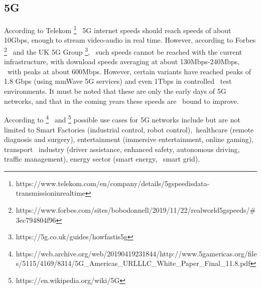 \subsection{5G}
\label{subsec:5g}
According to Telekom \footnote{https://www.telekom.com/en/company/details/5g\-speed\-is\-data-transmission\-in\-real\-time} \
5G internet speeds should reach speeds of about 10Gbps, enough to stream video-audio in real time.
However, according to Forbes \footnote{https://www.forbes.com/sites/bobodonnell/2019/11/22/real\-world\-5g\-speeds/\#3ec794804f96} \
and the UK 5G Group \footnote{https://5g.co.uk/guides/how\-fast\-is\-5g}, \
such speeds cannot be reached with the current infrastructure, with download speeds averaging at about 130Mbps-240Mbps, \
with peaks at about 600Mbps.
However, certain variants have reached peaks of 1.8 Gbps (using mmWave 5G services) and even 1Tbps in controlled \
test environments.
It must be noted that these are only the early days of 5G networks, and that in the coming years these speeds are \
bound to improve.

According to
\footnote{https://web.archive.org/web/20190419231844/http://www.5gamericas.org/files/5115/4169/8314/5G\_Americas\_URLLLC\_White\_Paper\_Final\_11.8.pdf} \
and \footnote{https://en.wikipedia.org/wiki/5G}
possible use cases for 5G networks include but are not limited to  Smart Factories (industrial control, robot control),\
healthcare (remote diagnosis and surgery), entertainment (immersive entertainment, online gaming), transport \
industry (driver assistance, enhanced safety, autonomous driving, traffic management), energy sector (smart energy, \
smart grid).

